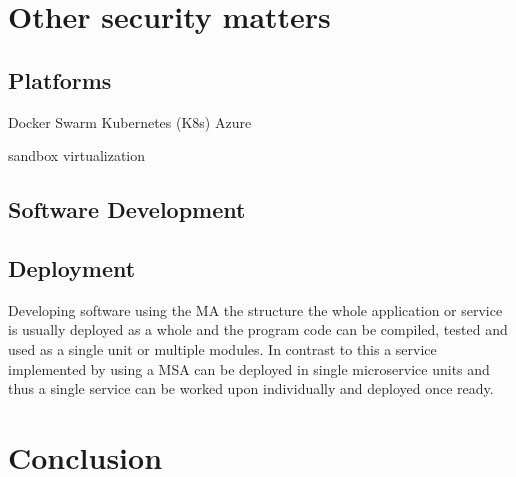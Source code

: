 \section{Other security matters}
    \subsection{Platforms}
        \begin{sloppypar}

        \end{sloppypar}
    
    Docker Swarm
    Kubernetes (K8s)
    Azure

    sandbox
    virtualization 

    \subsection{Software Development}
    \subsection{Deployment}
        \begin{sloppypar}

            Developing software using the MA the structure the whole application or service 
            is usually deployed as a whole and the program code can be compiled, tested and
            used as a single unit or multiple modules. In contrast to this a service implemented 
            by using a MSA can be deployed in single microservice units and thus a single service 
            can be worked upon individually and deployed once ready.
        
        \end{sloppypar}







\section{Conclusion}


